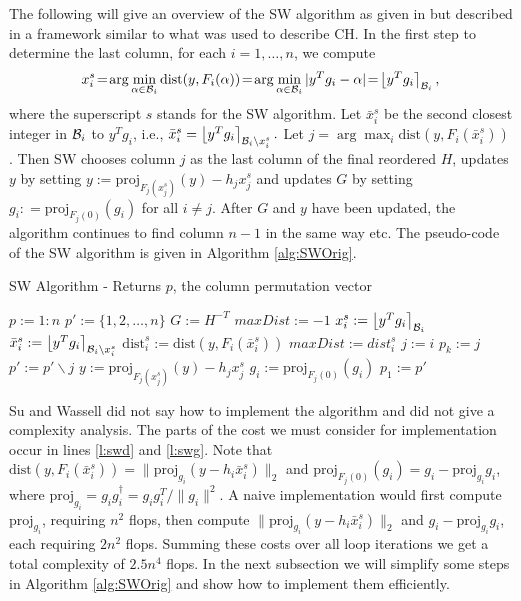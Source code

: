 \documentclass[12pt,Bold,letterpaper]{mcgilletdclass}
\newcommand{\be}{\begin{equation}}
\newcommand{\ee}{\end{equation}}
\newcommand{\dist}{\mathrm{dist}}
\begin{document}
The following will give an overview of the SW algorithm as given in
\cite{SuW05} but described in a framework similar to what was used to describe
CH. In the first step to determine the last column, for each $i = 1, \dots, n$,
we compute 
\be
x_i^s \!=\! \arg\min_{\alpha\in {\cal B}_i}\dist(y,F_i(\alpha)) 
\!=\!  \arg\min _{\alpha\in {\cal B}_i}| y^Tg_i - \alpha | \!=\! \left \lfloor y^Tg_i \right \rceil_{{\cal B}_i},
\label{eq:xis}
\ee
where the superscript $s$  stands for the SW algorithm.
Let $\bar{x}_i^s$ be the second closest integer in ${{\cal B}_i }$ to $y^Tg_i$, i.e.,
$\bar{x}_i^s = \left \lfloor y^Tg_i \right \rceil_{{\cal B}_i\backslash x_i^s}.$
Let $j = \arg\max_i  \dist (y,F_i(\bar{x}_i^s))$. 
Then SW chooses column $j$ as the last column of the final reordered $H$,
 updates $y$ by setting 
$y:=\mbox{proj}_{F_j(x_j^s)}(y) -h_jx_j^s$  and 
updates $G$ by setting $ g_i: = \mbox{proj}_{F_j(0)}(g_i)$ for all $i\neq j$. 
After $G$ and $y$ have been updated, the algorithm continues to find column $n-1$ in the
same way etc. The pseudo-code of the SW algorithm is given in Algorithm \ref{alg:SWOrig}.
\begin{algorithm}
\caption{SW Algorithm - Returns $p$, the column permutation vector}
\label{alg:SWOrig}
\begin{algorithmic}[1]
\STATE $p := 1:n$
\STATE $p' := \{1, 2, \ldots, n\}$
\STATE \label{l:swG} $G := H^{-T}$ \hfill %
	\STATE $maxDist := -1$
		\STATE $x_i^s := \left \lfloor  y^Tg_i \right \rceil_{{\cal B }_i}$ \hfill%
		     \label{l:swx}
		\STATE $\bar{x}_i^s := \left \lfloor y^Tg_i \right \rceil_{{{\cal B }_i}{\backslash x_i^s}}$
		    \label{l:swbx}
		\STATE  \label{l:swd} $\dist_i^s := \dist(y,F_i(\bar{x}_i^s))$ %
			\STATE $maxDist := dist_i^s$
			\STATE $j := i$
		\ENDIF
	\ENDFOR
	\STATE $p_k := j$
	\STATE $p' := p' \backslash j$
	\STATE $y := \mbox{proj}_{F_j(x_j^s)}(y) -h_jx_j^s$  \label{l:swy}
		\STATE \label{l:swg} $g_i := \mbox{proj}_{F_j(0)}(g_i) $ %
	\ENDFOR
\ENDFOR
\STATE $p_1 := p'$
\end{algorithmic}
\end{algorithm}

Su and Wassell did not say how to implement the algorithm and did not give a complexity analysis.
The parts of the cost we must consider for implementation occur in
lines \ref{l:swd} and \ref{l:swg}.
Note that $ \dist(y,F_i(\bar{x}_i^s))=\|\mbox{proj}_{g_i}(y-h_i\bar{x}_i^s)\|_2$
and $\mbox{proj}_{F_j(0)}(g_i)= g_i -\mbox{proj}_{g_i} g_i$,
where $\mbox{proj}_{g_i}=g_ig_i^\dag = g_ig_i^T/\|g_i\|^2$. 
A naive implementation would first compute $\mbox{proj}_{g_i}$, requiring $n^2$ flops, then compute 
$\|\mbox{proj}_{g_i}(y-h_i\bar{x}_i^s)\|_2$ and $g_i -\mbox{proj}_{g_i} g_i$, each requiring $2n^2$ flops.
Summing these costs over all loop iterations we get a total complexity of $2.5n^4$ flops.
In the next subsection we will simplify some steps in Algorithm \ref{alg:SWOrig}
and show how to  implement them efficiently.
\end{document}
